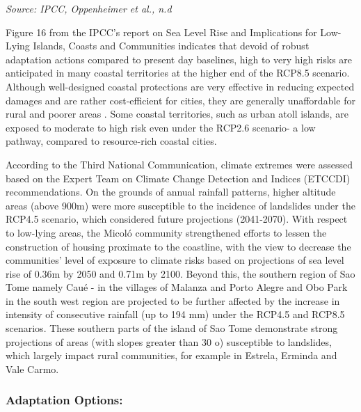 \documentclass[
]{book}
\begin{document}
\emph{Source: IPCC, Oppenheimer et al., n.d}

Figure 16 from the IPCC's report on Sea Level Rise and Implications for Low-Lying Islands, Coasts and Communities indicates that devoid of robust adaptation actions compared to present day baselines, high to very high risks are anticipated in many coastal territories at the higher end of the RCP8.5 scenario. Although well-designed coastal protections are very effective in reducing expected damages and are rather cost-efficient for cities, they are generally unaffordable for rural and poorer areas . Some coastal territories, such as urban atoll islands, are exposed to moderate to high risk even under the RCP2.6 scenario- a low pathway, compared to resource-rich coastal cities.

According to the Third National Communication, climate extremes were assessed based on the Expert Team on Climate Change Detection and Indices (ETCCDI) recommendations. On the grounds of annual rainfall patterns, higher altitude areas (above 900m) were more susceptible to the incidence of landslides under the RCP4.5 scenario, which considered future projections (2041-2070). With respect to low-lying areas, the Micoló community strengthened efforts to lessen the construction of housing proximate to the coastline, with the view to decrease the communities' level of exposure to climate risks based on projections of sea level rise of 0.36m by 2050 and 0.71m by 2100. Beyond this, the southern region of Sao Tome namely Caué - in the villages of Malanza and Porto Alegre and Obo Park in the south west region are projected to be further affected by the increase in intensity of consecutive rainfall (up to 194 mm) under the RCP4.5 and RCP8.5 scenarios. These southern parts of the island of Sao Tome demonstrate strong projections of areas (with slopes greater than 30 o) susceptible to landslides, which largely impact rural communities, for example in Estrela, Erminda and Vale Carmo.

\hypertarget{adaptation-options-16}{%
\subsubsection{Adaptation Options:}\label{adaptation-options-16}}
\end{document}
